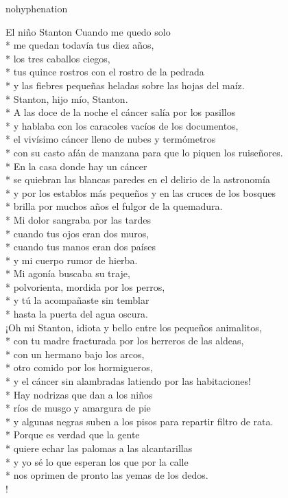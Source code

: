 \documentclass[
    a5paper,
    DIV=10,
    12pt,
    notitlepage,
    oneside,]
{scrbook} %
\begin{document}
\begin{hyphenrules}{nohyphenation}
\begin{poem}{El niño Stanton}{}{}
Cuando me quedo solo\\*
me quedan todavía tus diez años,\\*
los tres caballos ciegos,\\*
tus quince rostros con el rostro de la pedrada\\*
y las fiebres pequeñas heladas sobre las hojas del maíz.\\*
Stanton, hijo mío, Stanton.\\*
A las doce de la noche el cáncer salía por los pasillos\\*
y hablaba con los caracoles vacíos de los documentos,\\*
el vivísimo cáncer lleno de nubes y termómetros\\*
con su casto afán de manzana para que lo piquen los ruiseñores.\\*
En la casa donde hay un cáncer\\*
se quiebran las blancas paredes en el delirio de la astronomía\\*
y por los establos más pequeños y en las cruces de los bosques\\*
brilla por muchos años el fulgor de la quemadura.\\*
Mi dolor sangraba por las tardes\\*
cuando tus ojos eran dos muros,\\*
cuando tus manos eran dos países\\*
y mi cuerpo rumor de hierba.\\*
Mi agonía buscaba su traje,\\*
polvorienta, mordida por los perros,\\*
y tú la acompañaste sin temblar\\*
hasta la puerta del agua oscura.\\

¡Oh mi Stanton, idiota y bello entre los pequeños animalitos,\\*
con tu madre fracturada por los herreros de las aldeas,\\*
con un hermano bajo los arcos,\\*
otro comido por los hormigueros,\\*
y el cáncer sin alambradas latiendo por las habitaciones!\\*
Hay nodrizas que dan a los niños\\*
ríos de musgo y amargura de pie\\*
y algunas negras suben a los pisos para repartir filtro de rata.\\*
Porque es verdad que la gente\\*
quiere echar las palomas a las alcantarillas\\*
y yo sé lo que esperan los que por la calle\\*
nos oprimen de pronto las yemas de los dedos.\\!


\end{poem}
\end{hyphenrules}
\end{document}
